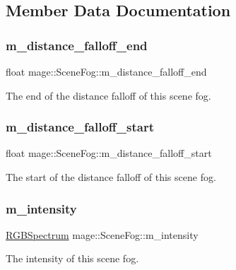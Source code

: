 \subsection{Member Data Documentation}
\hypertarget{structmage_1_1_scene_fog_af5945c293556cc515a7daf324c11e27a}{}\label{structmage_1_1_scene_fog_af5945c293556cc515a7daf324c11e27a} 
\subsubsection{\texorpdfstring{m\+\_\+distance\+\_\+falloff\+\_\+end}{m\_distance\_falloff\_end}}
{\footnotesize\ttfamily float mage\+::\+Scene\+Fog\+::m\+\_\+distance\+\_\+falloff\+\_\+end\hspace{0.3cm}{\ttfamily [private]}}

The end of the distance falloff of this scene fog. \hypertarget{structmage_1_1_scene_fog_ad3a788fe93c541347e96c470fc874453}{}\label{structmage_1_1_scene_fog_ad3a788fe93c541347e96c470fc874453} 
\subsubsection{\texorpdfstring{m\+\_\+distance\+\_\+falloff\+\_\+start}{m\_distance\_falloff\_start}}
{\footnotesize\ttfamily float mage\+::\+Scene\+Fog\+::m\+\_\+distance\+\_\+falloff\+\_\+start\hspace{0.3cm}{\ttfamily [private]}}

The start of the distance falloff of this scene fog. \hypertarget{structmage_1_1_scene_fog_ad3758984c5a1941cd883dd82f8ebe975}{}\label{structmage_1_1_scene_fog_ad3758984c5a1941cd883dd82f8ebe975} 
\subsubsection{\texorpdfstring{m\+\_\+intensity}{m\_intensity}}
{\footnotesize\ttfamily \hyperlink{structmage_1_1_r_g_b_spectrum}{R\+G\+B\+Spectrum} mage\+::\+Scene\+Fog\+::m\+\_\+intensity\hspace{0.3cm}{\ttfamily [private]}}

The intensity of this scene fog. 